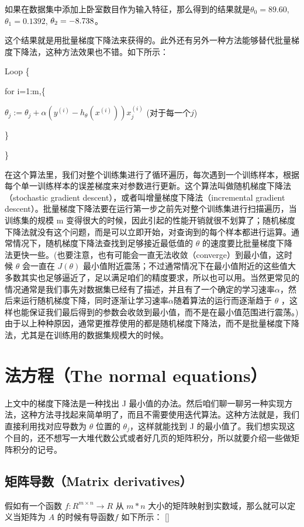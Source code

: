 \documentclass[UTF8]{ctexart}
\begin{document}
		如果在数据集中添加上卧室数目作为输入特征，那么得到的结果就是$ \theta_{0} = 89.60$, $\theta_{1} = 0.1392$, $\theta_{2} = \--8.738$。
		
		这个结果就是用批量梯度下降法来获得的。此外还有另外一种方法能够替代批量梯度下降法，这种方法效果也不错。如下所示：
		
		\par Loop \{
			\par \setlength \parindent{2em} for i=1:m,\{ 
				\begin{center}
					$ \theta_{j} := \theta_{j} + \alpha (y^{(i)} - h_{\theta}(x^{(i)}))x_{j}^{(i)}$
				(对于每一个$j$)
				\end{center}
			\par \setlength \parindent{2em} \}
		\par \}
		
		在这个算法里，我们对整个训练集进行了循环遍历，每次遇到一个训练样本，根据每个单一训练样本的误差梯度来对参数进行更新。这个算法叫做随机梯度下降法（stochastic gradient descent），或者叫增量梯度下降法（incremental gradient descent）。批量梯度下降法要在运行第一步之前先对整个训练集进行扫描遍历，当训练集的规模 m 变得很大的时候，因此引起的性能开销就很不划算了；随机梯度下降法就没有这个问题，而是可以立即开始，对查询到的每个样本都进行运算。通常情况下，随机梯度下降法查找到足够接近最低值的 $ \theta $ 的速度要比批量梯度下降法更快一些。(也要注意，也有可能会一直无法收敛（converge）到最小值，这时候 $ \theta $ 会一直在 $ J( \theta )$ 最小值附近震荡；不过通常情况下在最小值附近的这些值大多数其实也足够逼近了，足以满足咱们的精度要求，所以也可以用。当然更常见的情况通常是我们事先对数据集已经有了描述，并且有了一个确定的学习速率$\alpha$，然后来运行随机梯度下降，同时逐渐让学习速率$\alpha$随着算法的运行而逐渐趋于 $ \theta $ ，这样也能保证我们最后得到的参数会收敛到最小值，而不是在最小值范围进行震荡。) 由于以上种种原因，通常更推荐使用的都是随机梯度下降法，而不是批量梯度下降法，尤其是在训练用的数据集规模大的时候。 
		
		\section{法方程（The normal equations） }
		上文中的梯度下降法是一种找出 J 最小值的办法。然后咱们聊一聊另一种实现方法，这种方法寻找起来简单明了，而且不需要使用迭代算法。这种方法就是，我们直接利用找对应导数为 $ \theta $ 位置的 $ \theta_{j} $，这样就能找到 J 的最小值了。我们想实现这个目的，还不想写一大堆代数公式或者好几页的矩阵积分，所以就要介绍一些做矩阵积分的记号。
		
		\subsection{矩阵导数（Matrix derivatives）}
		假如有一个函数 $ f : R^{m×n} \longrightarrow R $ 从 $ m * n $ 大小的矩阵映射到实数域，那么就可以定义当矩阵为 $A$ 的时候有导函数$ f $ 如下所示：
		[]
		
		
		
\end{document}
